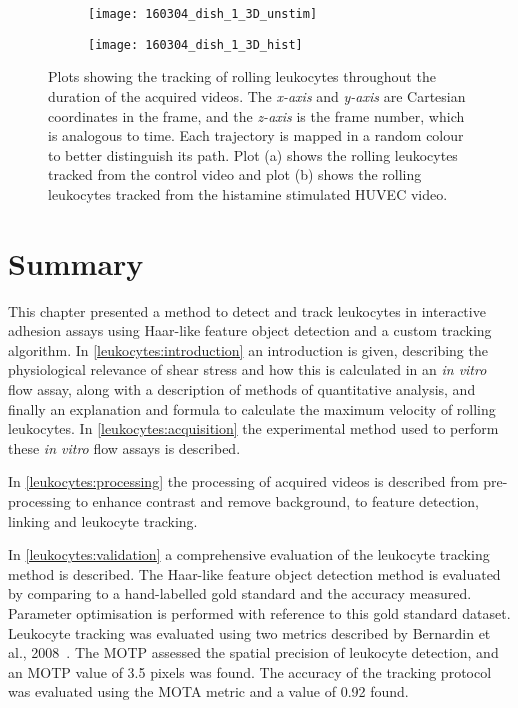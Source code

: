 \begin{figure}[htbp]\centering
	\begin{subfigure}[b]{0.49\linewidth}
		\centering
		\texttt{[image: 160304\_dish\_1\_3D\_unstim]}
		\caption{}
		\label{figure:results:3D_unstim}
		\vspace{1ex}
	\end{subfigure}
	\begin{subfigure}[b]{0.49\linewidth}
		\centering
		\texttt{[image: 160304\_dish\_1\_3D\_hist]}
		\caption{}
		\label{figure:results:3D_hist}
		\vspace{1ex}
	\end{subfigure}
\caption[3D plots of rolling leukocyte trajectories]{Plots showing the tracking of rolling leukocytes throughout the duration of the acquired videos. The \emph{x-axis} and \emph{y-axis} are Cartesian coordinates in the frame, and the \emph{z-axis} is the frame number, which is analogous to time. Each trajectory is mapped in a random colour to better distinguish its path. Plot (a) shows the rolling leukocytes tracked from the control video and plot (b) shows the rolling leukocytes tracked from the histamine stimulated HUVEC video.}
\label{figure:results:3D}
\end{figure}

\section{Summary}
\label{leukocytes:summary}
This chapter presented a method to detect and track leukocytes in interactive adhesion assays using Haar-like feature object detection and a custom tracking algorithm. In \autoref{leukocytes:introduction} an introduction is given, describing the physiological relevance of shear stress and how this is calculated in an \emph{in vitro} flow assay, along with a description of methods of quantitative analysis, and finally an explanation and formula to calculate the maximum velocity of rolling leukocytes. In \autoref{leukocytes:acquisition} the experimental method used to perform these \emph{in vitro} flow assays is described.

In \autoref{leukocytes:processing} the processing of acquired videos is described from pre-processing to enhance contrast and remove background, to feature detection, linking and leukocyte tracking. 

In \autoref{leukocytes:validation} a comprehensive evaluation of the leukocyte tracking method is described. The Haar-like feature object detection method is evaluated by comparing to a hand-labelled gold standard and the accuracy measured. Parameter optimisation is performed with reference to this gold standard dataset. Leukocyte tracking was evaluated using two metrics described by Bernardin et al., 2008~\cite{Bernardin2008}. The MOTP assessed the spatial precision of leukocyte detection, and an MOTP value of 3.5 pixels was found. The accuracy of the tracking protocol was evaluated using the MOTA metric and a value of 0.92 found.

